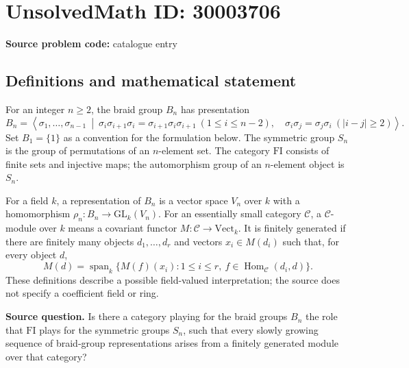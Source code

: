 \documentclass[11pt]{article}
\begin{document}
\section*{UnsolvedMath ID: 30003706}
\textbf{Source problem code:} catalogue entry
\subsection{Definitions and mathematical statement}
For an integer \(n\geq 2\), the braid group \(B_n\) has presentation
\[
B_n=\left\langle \sigma_1,\ldots,\sigma_{n-1}\ \middle|\ \sigma_i\sigma_{i+1}\sigma_i=\sigma_{i+1}\sigma_i\sigma_{i+1}\ (1\leq i\leq n-2),\quad \sigma_i\sigma_j=\sigma_j\sigma_i\ (|i-j|\geq 2)\right\rangle.
\]
Set \(B_1=\{1\}\) as a convention for the formulation below. The symmetric group \(S_n\) is the group of permutations of an \(n\)-element set. The category \(\mathrm{FI}\) consists of finite sets and injective maps; the automorphism group of an \(n\)-element object is \(S_n\).

For a field \(k\), a representation of \(B_n\) is a vector space \(V_n\) over \(k\) with a homomorphism \(\rho_n:B_n\to\mathrm{GL}_k(V_n)\). For an essentially small category \(\mathcal C\), a \(\mathcal C\)-module over \(k\) means a covariant functor \(M:\mathcal C\to\mathrm{Vect}_k\). It is finitely generated if there are finitely many objects \(d_1,\ldots,d_r\) and vectors \(x_i\in M(d_i)\) such that, for every object \(d\),
\[
M(d)=\operatorname{span}_k\{M(f)(x_i):1\leq i\leq r,\ f\in\operatorname{Hom}_{\mathcal C}(d_i,d)\}.
\]
These definitions describe a possible field-valued interpretation; the source does not specify a coefficient field or ring.

\textbf{Source question.} Is there a category playing for the braid groups \(B_n\) the role that \(\mathrm{FI}\) plays for the symmetric groups \(S_n\), such that every slowly growing sequence of braid-group representations arises from a finitely generated module over that category?
\end{document}
